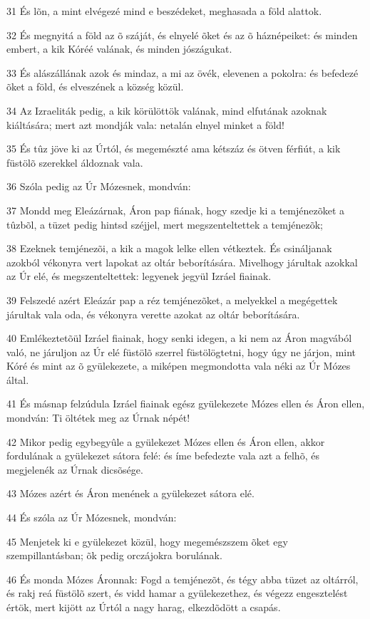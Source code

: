 \par 31 És lõn, a mint elvégezé mind e beszédeket, meghasada a föld alattok.
\par 32 És megnyitá a föld az õ száját, és elnyelé õket és az õ háznépeiket: és minden embert, a kik Kóréé valának, és minden jószágukat.
\par 33 És alászállának azok és mindaz, a mi az övék, elevenen a pokolra: és befedezé õket a föld, és elveszének a község közül.
\par 34 Az Izraeliták pedig, a kik körülöttök valának, mind elfutának azoknak kiáltására; mert azt mondják vala: netalán elnyel minket a föld!
\par 35 És tûz jöve ki az Úrtól, és megemészté ama kétszáz és ötven férfiút, a kik füstölõ szerekkel áldoznak vala.
\par 36 Szóla pedig az Úr Mózesnek, mondván:
\par 37 Mondd meg Eleázárnak, Áron pap fiának, hogy szedje ki a temjénezõket a tûzbõl, a tüzet pedig hintsd széjjel, mert megszenteltettek a temjénezõk;
\par 38 Ezeknek temjénezõi, a kik a magok lelke ellen vétkeztek. És csináljanak azokból vékonyra vert lapokat az oltár beborítására. Mivelhogy járultak azokkal az Úr elé, és megszenteltettek: legyenek jegyül Izráel fiainak.
\par 39 Felszedé azért Eleázár pap a réz temjénezõket, a melyekkel a megégettek járultak vala oda, és vékonyra verette azokat az oltár beborítására.
\par 40 Emlékeztetõül Izráel fiainak, hogy senki idegen, a ki nem az Áron magvából való, ne járuljon az Úr elé füstölõ szerrel füstölögtetni, hogy úgy ne járjon, mint Kóré és mint az õ gyülekezete, a miképen megmondotta vala néki az Úr Mózes által.
\par 41 És másnap felzúdula Izráel fiainak egész gyülekezete Mózes ellen és Áron ellen, mondván: Ti öltétek meg az Úrnak népét!
\par 42 Mikor pedig egybegyûle a gyülekezet Mózes ellen és Áron ellen, akkor fordulának a gyülekezet sátora felé: és íme befedezte vala azt a felhõ, és megjelenék az Úrnak dicsõsége.
\par 43 Mózes azért és Áron menének a gyülekezet sátora elé.
\par 44 És szóla az Úr Mózesnek, mondván:
\par 45 Menjetek ki e gyülekezet közül, hogy megemészszem õket egy szempillantásban; õk pedig orczájokra borulának.
\par 46 És monda Mózes Áronnak: Fogd a temjénezõt, és tégy abba tüzet az oltárról, és rakj reá füstölõ szert, és vidd hamar a gyülekezethez, és végezz engesztelést értök, mert kijött az Úrtól a nagy harag, elkezdõdött a csapás.
